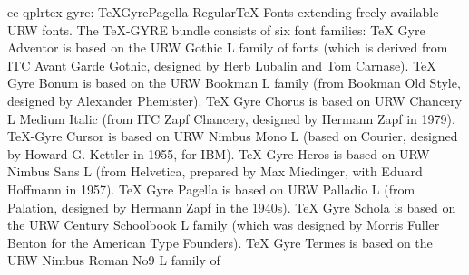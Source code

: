 \documentclass{ddltxtyp}
\begin{document}
\begin{package}{ec-qplr}{tex-gyre: TeXGyrePagella-Regular}{{\TeX} Fonts extending freely available URW fonts.}
The {\TeX}-GYRE bundle consists of six font families: {\TeX} Gyre
Adventor is based on the URW Gothic L family of fonts (which is
derived from ITC Avant Garde Gothic, designed by Herb Lubalin
and Tom Carnase). {\TeX} Gyre Bonum is based on the URW Bookman L
family (from Bookman Old Style, designed by Alexander
Phemister). {\TeX} Gyre Chorus is based on URW Chancery L Medium
Italic (from ITC Zapf Chancery, designed by Hermann Zapf in
1979). {\TeX}-Gyre Cursor is based on URW Nimbus Mono L (based on
Courier, designed by Howard G. Kettler in 1955, for IBM). {\TeX}
Gyre Heros is based on URW Nimbus Sans L (from Helvetica,
prepared by Max Miedinger, with Eduard Hoffmann in 1957). {\TeX}
Gyre Pagella is based on URW Palladio L (from Palation,
designed by Hermann Zapf in the 1940s). {\TeX} Gyre Schola is
based on the URW Century Schoolbook L family (which was
designed by Morris Fuller Benton for the American Type
Founders). {\TeX} Gyre Termes is based on the URW Nimbus Roman No9
L family of %
\end{package}
\end{document}

